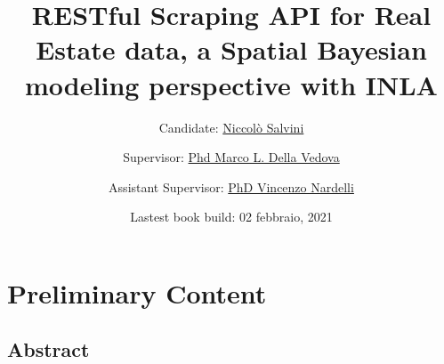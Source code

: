 \documentclass[
  12pt,
  a4paper,
  oneside]{book}
\title{RESTful Scraping API for Real Estate data, a Spatial Bayesian modeling perspective with INLA}
\author{Candidate: \href{https://niccolosalvini.netlify.app/}{Niccolò Salvini} \and Supervisor: \href{https://mldv.it/home/}{Phd Marco L. Della Vedova} \and Assistant Supervisor: \href{https://github.com/vincnardelli}{PhD Vincenzo Nardelli}}
\date{Lastest book build: 02 febbraio, 2021}
\let\oldmaketitle\maketitle
\theoremstyle{definition}
\theoremstyle{definition}
\theoremstyle{definition}
\theoremstyle{remark}
\begin{document}
\maketitle


\newpage

\let\maketitle\oldmaketitle
\maketitle

{
\setcounter{tocdepth}{2}
\tableofcontents
}
\listoftables
\listoffigures
{}
\hypertarget{preliminary-content}{%
\chapter*{Preliminary Content}\label{preliminary-content}}

\hypertarget{abstract}{%
\section*{Abstract}\label{abstract}}
\end{document}
